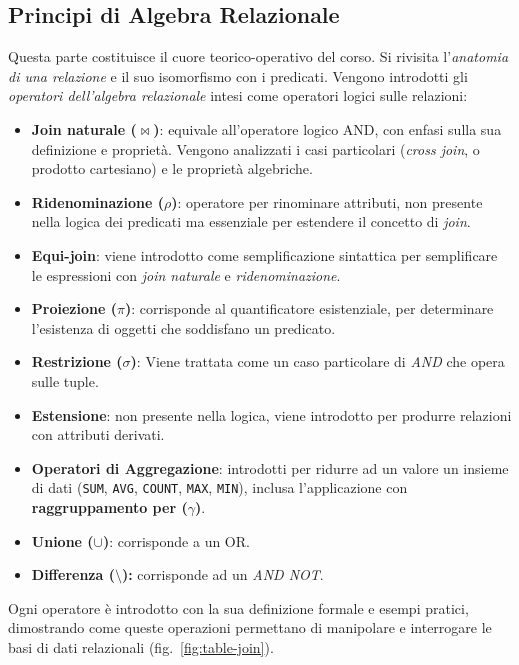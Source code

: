 \documentclass[withtimes]{easychair}
\theoremstyle{definition}
\begin{document}
\subsection{Principi di Algebra Relazionale}\label{principi-di-algebra-relazionale}

Questa parte costituisce il cuore teorico-operativo del corso. Si rivisita l'\emph{anatomia di una relazione} e il suo isomorfismo con i predicati. Vengono introdotti gli \emph{operatori dell'algebra relazionale} intesi come operatori logici sulle relazioni:

\begin{itemize}
  \item \textbf{Join naturale (\(\bowtie\))}: equivale all'operatore logico AND, con enfasi sulla sua definizione e proprietà. Vengono analizzati i casi particolari (\emph{cross join}, o prodotto cartesiano) e le proprietà algebriche.
  \item \textbf{Ridenominazione (\(\rho\))}: operatore per rinominare attributi, non presente nella logica dei predicati ma essenziale per estendere il concetto di \emph{join}.
  \item \textbf{Equi-join}: viene introdotto come semplificazione sintattica per semplificare le espressioni con \emph{join naturale} e \emph{ridenominazione}.
  \item \textbf{Proiezione (\(\pi\))}: corrisponde al quantificatore esistenziale, per determinare l'esistenza di oggetti che soddisfano un predicato.
  \item \textbf{Restrizione (\(\sigma\))}: Viene trattata come un caso particolare di \emph{AND} che opera sulle tuple.
  \item \textbf{Estensione}: non presente nella logica, viene introdotto per produrre relazioni con attributi derivati.
  \item \textbf{Operatori di Aggregazione}: introdotti per ridurre ad un valore un insieme di dati (\texttt{SUM}, \texttt{AVG}, \texttt{COUNT}, \texttt{MAX}, \texttt{MIN}), inclusa l'applicazione con \textbf{raggruppamento per (\(\gamma\))}.
  \item \textbf{Unione (\(\cup\))}: corrisponde a un OR.
  \item \textbf{Differenza (\(\setminus\)):} corrisponde ad un \emph{AND NOT}.
\end{itemize}

Ogni operatore è introdotto con la sua definizione formale e esempi pratici, dimostrando come queste operazioni permettano di manipolare e interrogare le basi di dati relazionali (fig.~\ref{fig:table-join}).
\end{document}
